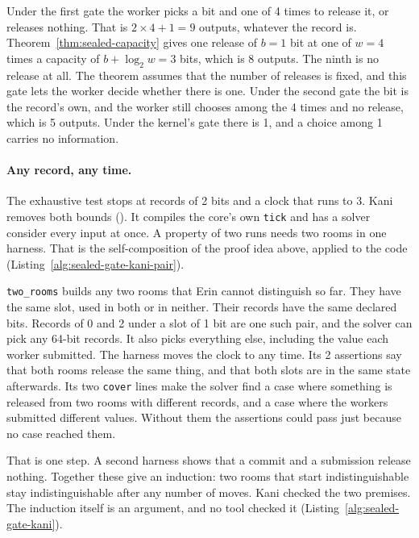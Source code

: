 

Under the first gate the worker picks a bit and one of 4 times to release
it, or releases nothing. That is $2\times4+1=9$ outputs, whatever the
record is. Theorem~\ref{thm:sealed-capacity} gives one release of $b=1$
bit at one of $w=4$ times a capacity of $b+\log_2 w=3$ bits, which is 8
outputs. The ninth is no release at all. The theorem assumes that the
number of releases is fixed, and this gate lets the worker decide whether
there is one. Under the second gate the bit is the record's own, and the
worker still chooses among the 4 times and no release, which is 5
outputs. Under the kernel's gate there is 1, and a choice among 1 carries
no information.

\paragraph{Any record, any time.}
The exhaustive test stops at records of 2 bits and a clock that runs to 3.
Kani removes both bounds (). It compiles
the core's own \texttt{tick} and has a solver consider every input at
once. A property of two runs needs two rooms in one harness. That is the
self-composition of the proof idea above, applied to the code
(Listing~\ref{alg:sealed-gate-kani-pair}).


\texttt{two\_rooms} builds any two rooms that Erin cannot distinguish so
far. They have the same slot, used in both or in neither. Their records
have the same declared bits. Records of 0 and 2 under a slot of 1
bit are one such pair, and the solver can pick any 64-bit records. It also
picks everything else, including the value each worker submitted. The
harness moves the clock to any time. Its 2 assertions say that both rooms
release the same thing, and that both slots are in the same state
afterwards. Its two \texttt{cover} lines make the solver find a case where
something is released from two rooms with different records, and a case
where the workers submitted different values. Without them the assertions
could pass just because no case reached them.

That is one step. A second harness shows that a commit and a submission
release nothing. Together these give an induction: two rooms that start
indistinguishable stay indistinguishable after any number of moves. Kani
checked the two premises. The induction itself is an argument, and no
tool checked it (Listing~\ref{alg:sealed-gate-kani}).

